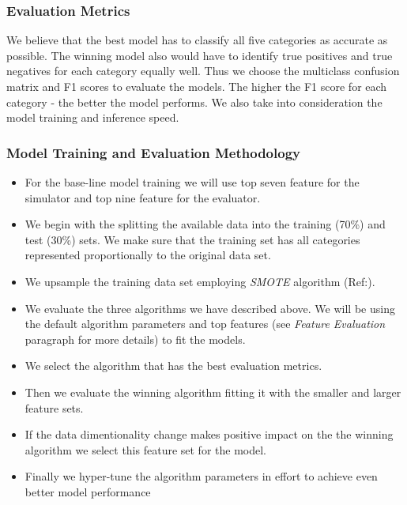 \hypertarget{evaluation-metrics}{%
\subsubsection{Evaluation Metrics}\label{evaluation-metrics}}

We believe that the best model has to classify all five categories as
accurate as possible. The winning model also would have to identify true
positives and true negatives for each category equally well. Thus we
choose the multiclass confusion matrix and F1 scores to evaluate the
models. The higher the F1 score for each category - the better the model
performs. We also take into consideration the model training and
inference speed.

\hypertarget{model-training-and-evaluation-methodology}{%
\subsubsection{Model Training and Evaluation
Methodology}\label{model-training-and-evaluation-methodology}}

\begin{itemize}
\tightlist
\item
  For the base-line model training we will use top seven feature for the
  simulator and top nine feature for the evaluator.
\item
  We begin with the splitting the available data into the training
  (70\%) and test (30\%) sets. We make sure that the training set has
  all categories represented proportionally to the original data set.
\item
  We upsample the training data set employing \emph{SMOTE} algorithm
  (Ref:\cite{smote}).
\item
  We evaluate the three algorithms we have described above. We will be
  using the default algorithm parameters and top features (see
  \emph{Feature Evaluation} paragraph for more details) to fit the
  models.
\item
  We select the algorithm that has the best evaluation metrics.
\item
  Then we evaluate the winning algorithm fitting it with the smaller and
  larger feature sets.
\item
  If the data dimentionality change makes positive impact on the the
  winning algorithm we select this feature set for the model.
\item
  Finally we hyper-tune the algorithm parameters in effort to achieve
  even better model performance
\end{itemize}

